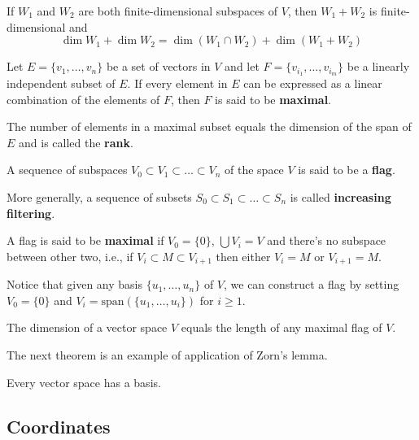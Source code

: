 \begin{theorem}
	If $W_1$ and $W_2$ are both finite-dimensional subspaces of $V$, then $W_1 + W_2$ is finite-dimensional and 
	\[
	    \dim W_1 + \dim W_2 = \dim (W_1 \cap W_2) + \dim (W_1 + W_2)
	\]
\end{theorem}

\begin{definition}[Maximal]\label{def:maximal}
	Let $E = \{ v_1, \ldots, v_n \}$ be a set of vectors in $V$ and let $F = \{ v_{i_1}, \ldots, v_{i_m} \}$ be a linearly independent subset of $E$. If every element in $E$ can be expressed as a linear combination of the elements of $F$, then $F$ is said to be \textbf{maximal}.
\end{definition}

The number of elements in a maximal subset equals the dimension of the span of $E$ and is called the \textbf{rank}.

\begin{definition}[Flags]
	A sequence of subspaces $V_0 \subset V_1 \subset \ldots \subset V_n$ of the space $V$ is said to be a \textbf{flag}.

	More generally, a sequence of subsets $S_0 \subset S_1 \subset \ldots \subset S_n$ is called \textbf{increasing filtering}.

	A flag is said to be \textbf{maximal} if $V_0 = \{ 0 \}$, $\bigcup V_i = V$ and there's no subspace between other two, i.e., if $V_i \subset M \subset V_{i+1}$ then either $V_i = M$ or $V_{i+1} = M$. 
\end{definition}

Notice that given any basis $\{ u_1, \ldots, u_n \}$ of $V$, we can construct a flag by setting $V_0 = \{ 0 \}$ and $V_i = \text{span}(\{ u_1, \ldots, u_i \})$ for $i \geq 1$.

\begin{theorem}
	The dimension of a vector space $V$ equals the length of any maximal flag of $V$.
\end{theorem}

The next theorem is an example of application of Zorn's lemma.

\begin{theorem}
	Every vector space has a basis.
\end{theorem}

\subsection*{Coordinates}

